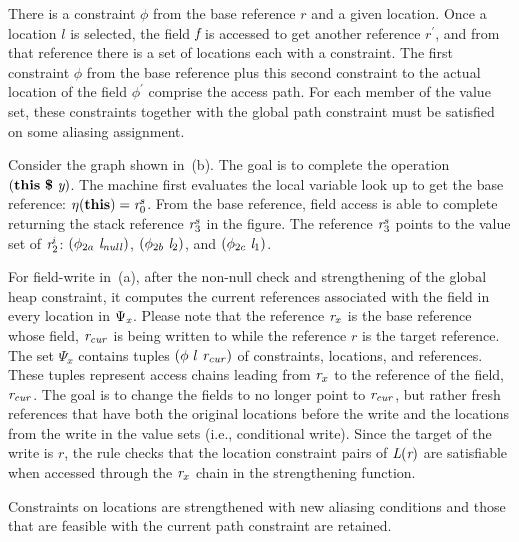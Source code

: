 There is a constraint $\phi$ from the base reference $r$ and a given
location. Once a location $l$ is selected, the field $\emph{f}$ is accessed to get
another reference $r^\prime$, and from that reference there is a set of locations
each with a constraint. The first constraint $\phi$ from the base reference
plus this second constraint to the actual location of the field $\phi^\prime$
comprise the access path. For each member of the value set, these
constraints together with the global path constraint must be satisfied
on some aliasing assignment.

\begin{comment}invoke the summarize rewrite rule
in~\figref{fig:symInit} that performs the initialization of the field
if it points to uninitialized locations. Once the initialization is
complete, we create a new local reference $r^\prime$. An important
property of the references in the bi-partiate graph is that they are
\emph{immutable}. Hence we create a new local reference and assign it
to the initialized reference, and return the local reference. In order
to de-reference a field $r.f$ we define a helper function which is
called the value set.

In the post-condition of the rewrite rule we assign
the value set of input reference $r$ to the local reference $r^\prime$
and return the local reference $r^\prime$ in the next state.
\end{comment}

Consider the graph shown in~(b). The goal is to
complete the operation $\lp\cfgt{this}\ \cfgt{\$}\ \cfgnt{y}\rp$. The
machine first evaluates the local variable look up to get the base
reference: $\eta(\textbf{this}) = \emph{r}^s_0$. From the base
reference, field access is able to complete returning the stack
reference $\emph{r}_3^s$ in the figure. The reference $\emph{r}_3^s$
points to the value set of $\emph{r}_2^i$:
$(\phi_{2a}\ \emph{l}_\mathit{null})$, $(\phi_{2b}\ \emph{l}_2)$,
and $(\phi_{2c}\ \emph{l}_1)$.

For field-write in~(a), after the
non-null check and strengthening of the global heap constraint, it computes the current references associated with the field in every location in $\Psi_{\emph{x}}$. Please note that the reference $\emph{r}_x$ is the base reference
whose field, $\emph{r}_\mathit{cur}$ is being written to while the
reference $r$ is the target reference. The set $\Psi_x$ contains
tuples $(\phi\ l\ \cfgnt{r}_\mathit{cur})$ of constraints, locations, and
references. These tuples represent access chains leading from $\emph{r}_x$ to
the reference of the field, $\emph{r}_\mathit{cur}$. The goal is to change the fields to no longer point to $\emph{r}_\mathit{cur}$, but rather fresh references that have both the original locations before the write and the locations from the write in the value sets (i.e., conditional write). Since the target of the write is $r$, the rule checks that
the location constraint pairs of $\emph{L}(\emph{r})$ are satisfiable when accessed
through the $\emph{r}_x$ chain in the strengthening function.

Constraints on locations are strengthened with new aliasing conditions
and those that are feasible with the current path constraint are
retained. 

